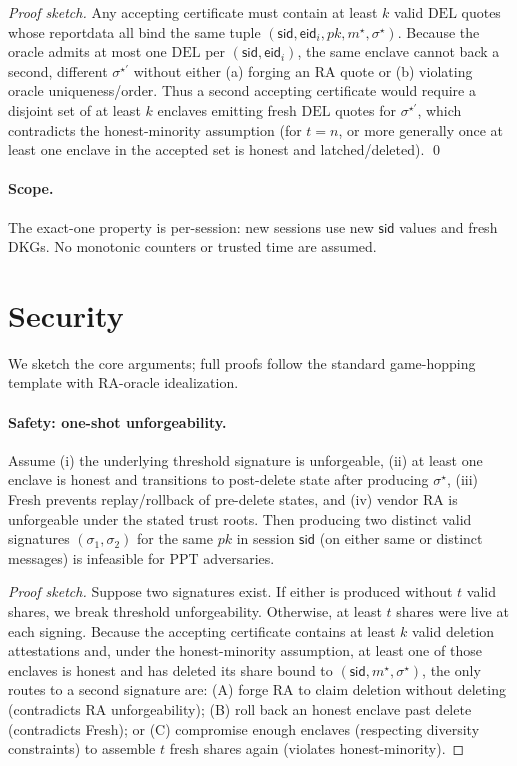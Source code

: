 \documentclass[runningheads,orivec]{llncs}
\newcommand{\sid}{\mathsf{sid}}
\begin{document}
\emph{Proof sketch.} Any accepting certificate must contain at least $k$ valid $\mathrm{DEL}$ quotes whose reportdata all bind the same tuple $(\sid,\mathsf{eid}_i,pk,m^{\star},\sigma^{\star})$. Because the oracle admits at most one $\mathrm{DEL}$ per $(\sid,\mathsf{eid}_i)$, the same enclave cannot back a second, different $\sigma^{\star'}$ without either (a) forging an RA quote or (b) violating oracle uniqueness/order. Thus a second accepting certificate would require a disjoint set of at least $k$ enclaves emitting fresh $\mathrm{DEL}$ quotes for $\sigma^{\star'}$, which contradicts the honest-minority assumption (for $t\!=\!n$, or more generally once at least one enclave in the accepted set is honest and latched/deleted). \qed

\paragraph{Scope.}
The exact-one property is per-session: new sessions use new $\sid$ values and fresh DKGs. No monotonic counters or trusted time are assumed.

\section{Security}\label{sec:security}
We sketch the core arguments; full proofs follow the standard game-hopping template with RA-oracle idealization.

\paragraph{Safety: one-shot unforgeability.}
\begin{theorem}\label{thm:one-shot}
Assume (i) the underlying threshold signature is unforgeable, (ii) at least one enclave is honest and transitions to post-delete state after producing $\sigma^{\star}$, (iii) \textsf{Fresh} prevents replay/rollback of pre-delete states, and (iv) vendor RA is unforgeable under the stated trust roots. Then producing two distinct valid signatures $(\sigma_1,\sigma_2)$ for the same $pk$ in session $\mathsf{sid}$ (on either same or distinct messages) is infeasible for PPT adversaries.
\end{theorem}

\begin{proof}[Proof sketch]
Suppose two signatures exist. If either is produced without $t$ valid shares, we break threshold unforgeability. Otherwise, at least $t$ shares were live at each signing. Because the accepting certificate contains at least $k$ valid deletion attestations and, under the honest-minority assumption, at least one of those enclaves is honest and has deleted its share bound to $(\mathsf{sid},m^{\star},\sigma^{\star})$, the only routes to a second signature are: (A) forge RA to claim deletion without deleting (contradicts RA unforgeability); (B) roll back an honest enclave past delete (contradicts \textsf{Fresh}); or (C) compromise enough enclaves (respecting diversity constraints) to assemble $t$ fresh shares again (violates honest-minority).
\end{proof}
\end{document}
